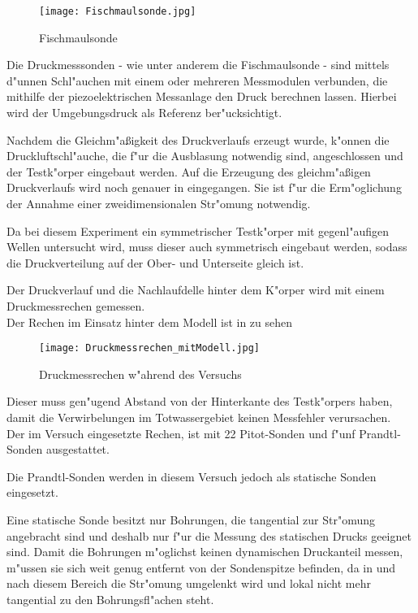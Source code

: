 \begin{figure}[h]
	\centering
	\texttt{[image: Fischmaulsonde.jpg]}
	\caption{Fischmaulsonde}
	\label{fig:Fischmaulsonde}
\end{figure}

Die Druckmesssonden - wie unter anderem die Fischmaulsonde - sind mittels d"unnen Schl"auchen mit einem oder mehreren Messmodulen verbunden, die mithilfe der piezoelektrischen Messanlage den Druck berechnen lassen. Hierbei wird der Umgebungsdruck als Referenz ber"ucksichtigt.

Nachdem die Gleichm"a\ss{}igkeit des Druckverlaufs erzeugt wurde, k"onnen die Druckluftschl"auche, die f"ur die Ausblasung notwendig sind, angeschlossen und der Testk"orper eingebaut werden. Auf die Erzeugung des gleichm"a\ss{}igen Druckverlaufs wird noch genauer in  eingegangen. Sie ist f"ur die Erm"oglichung der Annahme einer zweidimensionalen Str"omung notwendig.

Da bei diesem Experiment ein symmetrischer Testk"orper mit gegenl"aufigen Wellen untersucht wird, muss dieser auch symmetrisch eingebaut werden, sodass die Druckverteilung auf der Ober- und Unterseite gleich ist.

Der Druckverlauf und die Nachlaufdelle hinter dem K"orper wird mit einem Druckmessrechen gemessen.\\
Der Rechen im Einsatz hinter dem Modell ist in  zu sehen
\begin{figure}[h]
	\centering
	\texttt{[image: Druckmessrechen\_mitModell.jpg]}
	\caption{Druckmessrechen w"ahrend des Versuchs}
	\label{fig:Druckmessrechen}
\end{figure}
Dieser muss gen"ugend Abstand von der Hinterkante des Testk"orpers haben, damit die Verwirbelungen im Totwassergebiet keinen Messfehler verursachen.\\
Der im Versuch eingesetzte Rechen, ist mit 22 Pitot-Sonden und f"unf Prandtl-Sonden ausgestattet.

Die Prandtl-Sonden werden in diesem Versuch jedoch als statische Sonden eingesetzt.

Eine statische Sonde besitzt nur Bohrungen, die tangential zur Str"omung angebracht sind und deshalb nur f"ur die Messung des statischen Drucks geeignet sind.
Damit die Bohrungen m"oglichst keinen dynamischen Druckanteil messen, m"ussen sie sich weit genug entfernt von der Sondenspitze befinden, da in und nach diesem Bereich die Str"omung umgelenkt wird und lokal nicht mehr tangential zu den Bohrungsfl"achen steht.

